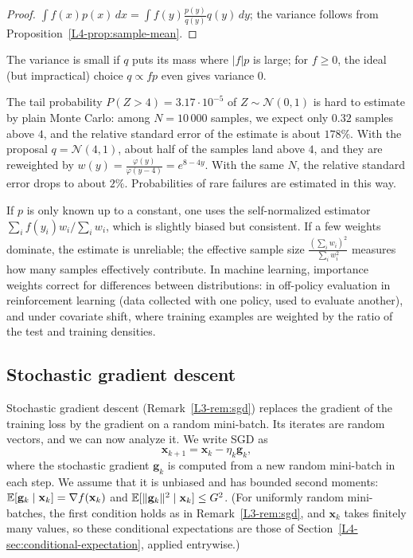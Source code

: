 \begin{proof}
    $\int f(x)p(x)\, dx = \int f(y)\frac{p(y)}{q(y)}q(y)\, dy$; the variance follows from Proposition~\ref{L4-prop:sample-mean}.
\end{proof}

The variance is small if $q$ puts its mass where $|f|p$ is large; for $f \geq 0$, the ideal (but impractical) choice $q \propto fp$ even gives variance $0$.

\begin{example}\label{L4-ex:importance}
    The tail probability $P(Z > 4) = 3.17 \cdot 10^{-5}$ of $Z \sim \mathcal{N}(0, 1)$ is hard to estimate by plain Monte Carlo: among $N = 10\,000$ samples, we expect only $0.32$ samples above $4$, and the relative standard error of the estimate is about $178\%$. With the proposal $q = \mathcal{N}(4, 1)$, about half of the samples land above $4$, and they are reweighted by $w(y) = \frac{\varphi(y)}{\varphi(y - 4)} = e^{8 - 4y}$. With the same $N$, the relative standard error drops to about $2\%$. Probabilities of rare failures are estimated in this way.
\end{example}

If $p$ is only known up to a constant, one uses the self-normalized estimator $\sum_i f(y_i)w_i / \sum_i w_i$, which is slightly biased but consistent. If a few weights dominate, the estimate is unreliable; the effective sample size $\frac{(\sum_i w_i)^2}{\sum_i w_i^2}$ measures how many samples effectively contribute. In machine learning, importance weights correct for differences between distributions: in off-policy evaluation in reinforcement learning (data collected with one policy, used to evaluate another), and under covariate shift, where training examples are weighted by the ratio of the test and training densities.

\subsection{Stochastic gradient descent}\label{L4-sec:sgd}

Stochastic gradient descent (Remark~\ref{L3-rem:sgd}) replaces the gradient of the training loss by the gradient on a random mini-batch. Its iterates are random vectors, and we can now analyze it. We write SGD as
\[\mathbf{x}_{k+1} = \mathbf{x}_k - \eta_k\mathbf{g}_k,\]
where the stochastic gradient $\mathbf{g}_k$ is computed from a new random mini-batch in each step. We assume that it is unbiased and has bounded second moments: $\mathbb{E}[\mathbf{g}_k \mid \mathbf{x}_k] = \nabla f(\mathbf{x}_k)$ and $\mathbb{E}[\lVert \mathbf{g}_k \rVert^2 \mid \mathbf{x}_k] \leq G^2$. (For uniformly random mini-batches, the first condition holds as in Remark~\ref{L3-rem:sgd}, and $\mathbf{x}_k$ takes finitely many values, so these conditional expectations are those of Section~\ref{L4-sec:conditional-expectation}, applied entrywise.)

